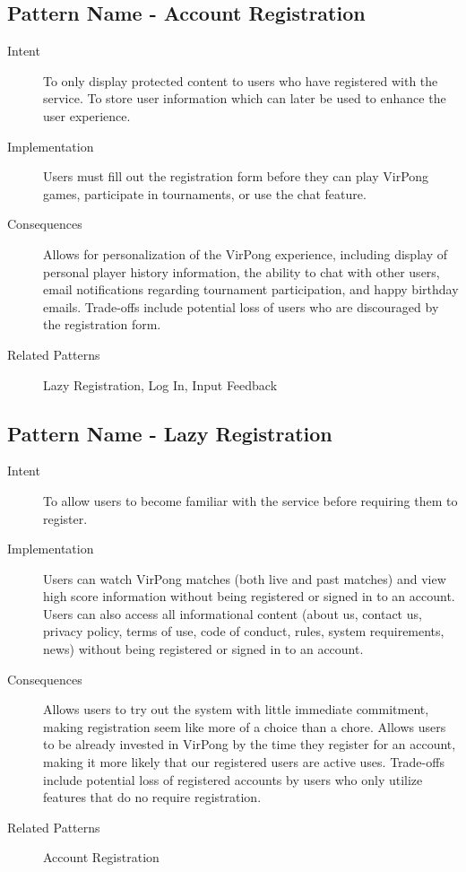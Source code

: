 \subsection{Pattern Name - Account Registration}
\begin{description}
\item[Intent] To only display protected content to users who have registered with the service. To store user information which can later be used to enhance the user experience.
\item[Implementation] Users must fill out the registration form before they can play VirPong games, participate in tournaments, or use the chat feature.
\item[Consequences] Allows for personalization of the VirPong experience, including display of personal player history information, the ability to chat with other users, email notifications regarding tournament participation, and happy birthday emails. Trade-offs include potential loss of users who are discouraged by the registration form.
\item[Related Patterns] Lazy Registration, Log In, Input Feedback
\end{description}
\subsection{Pattern Name - Lazy Registration}
\begin{description}
\item[Intent] To allow users to become familiar with the service before requiring them to register.
\item[Implementation] Users can watch VirPong matches (both live and past matches) and view high score information without being registered or signed in to an account. Users can also access all informational content (about us, contact us, privacy policy, terms of use, code of conduct, rules, system requirements, news) without being registered or signed in to an account.
\item[Consequences] Allows users to try out the system with little immediate commitment, making registration seem like more of a choice than a chore. Allows users to be already invested in VirPong by the time they register for an account, making it more likely that our registered users are active uses. Trade-offs include potential loss of registered accounts by users who only utilize features that do no require registration.
\item[Related Patterns] Account Registration
\end{description}
